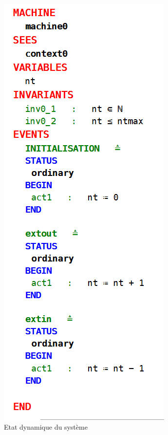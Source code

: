 \begin{figure}[H]
	\begin{center}	
		\includegraphics[scale=0.8]{images/mac0}
		\caption{Etat dynamique du système}
		\label{mac0}
	\end{center}
\end{figure}

